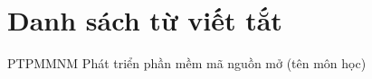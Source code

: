\chapter*{Danh sách từ viết tắt}
\begin{abbrv}
    
    \item[PTPMMNM]			Phát triển phần mềm mã nguồn mở (tên môn học)
    
\end{abbrv}
